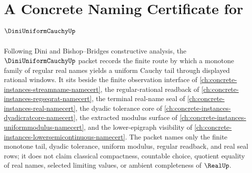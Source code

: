 \chapter{A Concrete Naming Certificate for $\DiniUniformCauchyUp$}
\label{ch:concrete-instances-dini-uniform-cauchy-namecert}

Following Dini and Bishop--Bridges constructive analysis, the $\DiniUniformCauchyUp$ packet records the finite route by which a monotone family of regular real names yields a uniform Cauchy tail through displayed rational windows. It sits beside the finite observation interface of \autoref{ch:concrete-instances-streamname-namecert}, the regular-rational readback of \autoref{ch:concrete-instances-regseqrat-namecert}, the terminal real-name seal of \autoref{ch:concrete-instances-real-namecert}, the dyadic tolerance core of \autoref{ch:concrete-instances-dyadicratcore-namecert}, the extracted modulus surface of \autoref{ch:concrete-instances-uniformmodulus-namecert}, and the lower-epigraph visibility of \autoref{ch:concrete-instances-lowersemicontinuous-namecert}. The packet names only the finite monotone tail, dyadic tolerance, uniform modulus, regular readback, and real seal rows; it does not claim classical compactness, countable choice, quotient equality of real names, selected limiting values, or ambient completeness of $\RealUp$.

